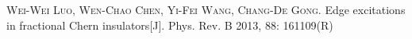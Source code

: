 \begin{publications}{99}

\item\textsc{Wei-Wei Luo, Wen-Chao Chen, Yi-Fei Wang, Chang-De Gong}. {Edge excitations in fractional Chern insulators}[J]. Phys. Rev. B 2013, 88: 161109(R)

    
\end{publications}
